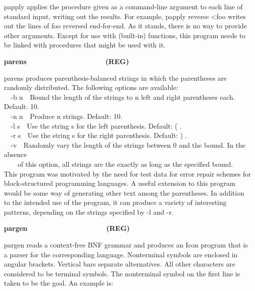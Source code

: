 \textsf{papply} applies the procedure given as a command-line argument
to each line of standard input, writing out the results. For example,
\textsf{papply reverse {\textless}foo} writes out the lines of foo
reversed end-for-end. As it stands, there is no way to provide other
arguments. Except for use with (built-in) functions, this program needs
to be linked with procedures that might be used with it. 

{\sffamily\bfseries
parens\ \ \ \ \ \ \ \ \ \ \ \ \ \ \ \ \ \ \ \ (REG)}

\textsf{parens} produces parenthesis-balanced strings in which the
parentheses are randomly distributed. The following options are
available:\\
\ \ \textsf{{}-b n}\ \ Bound the length of the strings to n left and
right parentheses each. Default: 10.\\
\ \ \textsf{{}-n n}\ \ Produce n strings. Default: 10.\\
\ \ \textsf{{}-l s}\ \ Use the string s for the left parenthesis.
Default: \textsf{{\textquotedbl}({\textquotedbl}} .\\
\ \ \textsf{{}-r s}\ \ Use the string s for the right parenthesis.
Default: \textsf{{\textquotedbl}){\textquotedbl} }.\\
\ \ \textsf{{}-v}\ \ Randomly vary the length of the strings between 0
and the bound. In the absence\\
\ \ \ \ of this option, all strings are the exactly as long as the
specified bound.\\
This program was motivated by the need for test data for error repair
schemes for block-structured programming languages. A useful extension
to this program would be some way of generating other text among the
parentheses. In addition to the intended use of the program, it can
produce a variety of interesting patterns, depending on the strings
specified by \textsf{{}-l} and \textsf{{}-r}.

{\sffamily\bfseries
pargen\ \ \ \ \ \ \ \ \ \ \ \ \ \ \ \ \ \ \ \ (REG)}

\textsf{pargen} reads a context-free BNF grammar and produces an Icon
program that is a parser for the corresponding language. Nonterminal
symbols are enclosed in angular brackets. Vertical bars separate
alternatives. All other characters are considered to be terminal
symbols. The nonterminal symbol on the first line is taken to be the
goal. An example is:


